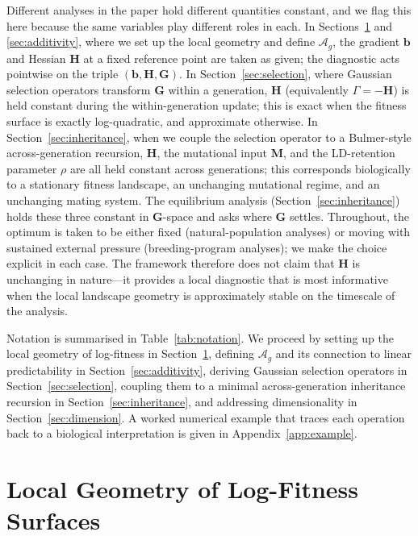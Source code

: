 \documentclass[9pt,twocolumn,twoside,lineno]{gsajnl}
\newcommand{\vect}[1]{\boldsymbol{#1}}
\newcommand{\mat}[1]{\mathbf{#1}}
\newcommand{\Ag}{\ensuremath{\mathcal{A}_{g}}\xspace}
\begin{document}
Different analyses in the paper hold different quantities constant, and we flag this here because the same variables play different roles in each. In Sections~\ref{sec:geometry} and \ref{sec:additivity}, where we set up the local geometry and define $\Ag$, the gradient $\vect{b}$ and Hessian $\mat{H}$ at a fixed reference point are taken as given; the diagnostic acts pointwise on the triple $(\vect{b}, \mat{H}, \mat{G})$. In Section~\ref{sec:selection}, where Gaussian selection operators transform $\mat{G}$ within a generation, $\mat{H}$ (equivalently $\Gamma = -\mat{H}$) is held constant during the within-generation update; this is exact when the fitness surface is exactly log-quadratic, and approximate otherwise. In Section~\ref{sec:inheritance}, when we couple the selection operator to a Bulmer-style across-generation recursion, $\mat{H}$, the mutational input $\mat{M}$, and the LD-retention parameter $\rho$ are all held constant across generations; this corresponds biologically to a stationary fitness landscape, an unchanging mutational regime, and an unchanging mating system. The equilibrium analysis (Section~\ref{sec:inheritance}) holds these three constant in $\mat{G}$-space and asks where $\mat{G}$ settles. Throughout, the optimum is taken to be either fixed (natural-population analyses) or moving with sustained external pressure (breeding-program analyses); we make the choice explicit in each case. The framework therefore does not claim that $\mat{H}$ is unchanging in nature---it provides a local diagnostic that is most informative when the local landscape geometry is approximately stable on the timescale of the analysis.

Notation is summarised in Table~\ref{tab:notation}. We proceed by setting up the local geometry of log-fitness in Section~\ref{sec:geometry}, defining \Ag and its connection to linear predictability in Section~\ref{sec:additivity}, deriving Gaussian selection operators in Section~\ref{sec:selection}, coupling them to a minimal across-generation inheritance recursion in Section~\ref{sec:inheritance}, and addressing dimensionality in Section~\ref{sec:dimension}. A worked numerical example that traces each operation back to a biological interpretation is given in Appendix~\ref{app:example}.

\section{Local Geometry of Log-Fitness Surfaces}
\label{sec:geometry}
\end{document}
